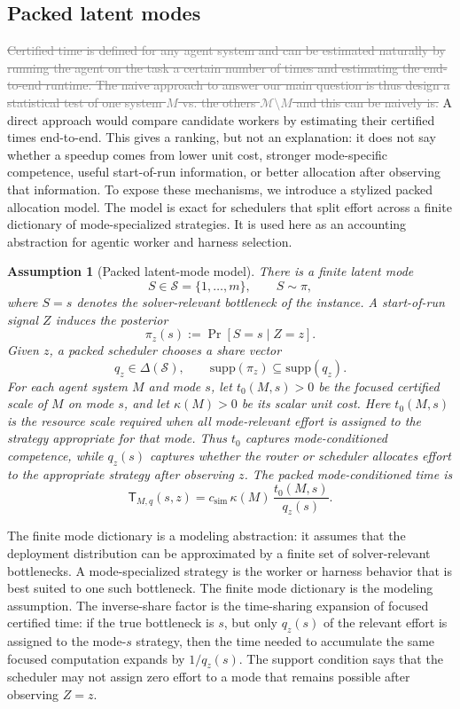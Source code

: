 \documentclass{article}
\newcommand{\oldtext}[1]{\textcolor{gray}{\sout{#1}}}
\newcommand{\newtext}[1]{\textcolor{green!50!black}{#1}}
\newtheorem{assumption}{Assumption}
\newcommand{\cS}{\mathcal{S}}
\begin{document}
\subsection{Packed latent modes}
\label{subsec:packed-latent-modes}

\oldtext{Certified time is defined for any agent system and can be estimated naturally by running the agent on the task a certain number of times and estimating the end-to-end runtime. The naive approach to answer our main question is thus design a statistical test of one system \(M\) vs. the others \(\mathcal M\setminus M\) and this can be naively is.}
\newtext{A direct approach would compare candidate workers by estimating their certified times end-to-end. This gives a ranking, but not an explanation: it does not say whether a speedup comes from lower unit cost, stronger mode-specific competence, useful start-of-run information, or better allocation after observing that information. To expose these mechanisms, we introduce a stylized packed allocation model.}
The model is exact for schedulers that split effort across a finite dictionary of mode-specialized strategies.
It is used here as an accounting abstraction for agentic worker and harness selection.

\begin{assumption}[Packed latent-mode model]
\label{ass:packed}
There is a finite latent mode
\[
    S\in\cS=\{1,\ldots,m\},
    \qquad
    S\sim\pi,
\]
where \(S=s\) denotes the solver-relevant bottleneck of the instance.
A start-of-run signal \(Z\) induces the posterior
\[
    \pi_z(s):=\Pr[S=s\mid Z=z].
\]
Given \(z\), a packed scheduler chooses a share vector
\[
    q_z\in\Delta(\cS),
    \qquad
    \mathrm{supp}(\pi_z)\subseteq \mathrm{supp}(q_z).
\]
For each agent system \(M\) and mode \(s\), let \(t_0(M,s)>0\) be the focused
certified scale of \(M\) on mode \(s\), and let \(\kappa(M)>0\) be its scalar unit cost.
\newtext{Here \(t_0(M,s)\) is the resource scale required when all mode-relevant effort is assigned to the strategy appropriate for that mode. Thus \(t_0\) captures mode-conditioned competence, while \(q_z(s)\) captures whether the router or scheduler allocates effort to the appropriate strategy after observing \(z\).}
The packed mode-conditioned time is
\[
    \mathsf T_{M,q}(s,z)
    =
    c_{\mathrm{sim}}\,
    \kappa(M)\,
    \frac{t_0(M,s)}{q_z(s)} .
\]
\end{assumption}

{\color{green!50!black}
The finite mode dictionary is a modeling abstraction: it assumes that the deployment distribution can be approximated by a finite set of solver-relevant bottlenecks.
A mode-specialized strategy is the worker or harness behavior that is best suited to one such bottleneck.
}
The finite mode dictionary is the modeling assumption.  The inverse-share factor is the
time-sharing expansion of focused certified time: if the true bottleneck is \(s\), but only
\(q_z(s)\) of the relevant effort is assigned to the mode-\(s\) strategy, then the time needed
to accumulate the same focused computation expands by \(1/q_z(s)\).
The support condition says that the scheduler may not assign zero effort to a mode that
remains possible after observing \(Z=z\).
\end{document}
